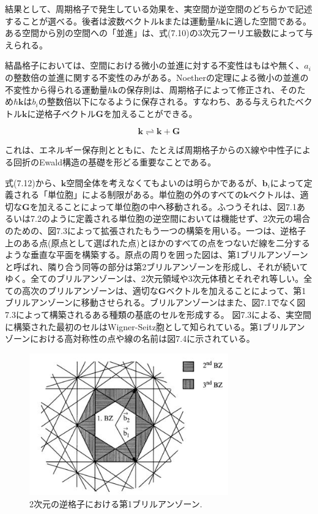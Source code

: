 \documentclass[11pt,a4j,uplatex]{jsarticle}
\begin{document}
結果として、周期格子で発生している効果を、実空間か逆空間のどちらかで記述することが選べる。後者は波数ベクトル$\bm{k}$または運動量$\hbar\bm{k}$に適した空間である。ある空間から別の空間への「並進」は、式(7.10)の3次元フーリエ級数によって与えられる。

結晶格子においては、空間における微小の並進に対する不変性はもはや無く、$a_i$の整数倍の並進に関する不変性のみがある。Noetherの定理による微小の並進の不変性から得られる運動量$\hbar\bm{k}$の保存則は、周期格子によって修正され、そのため$\hbar\bm{k}$は$b_i$の整数倍以下になるように保存される。すなわち、ある与えられたベクトル$\bm{k}$に逆格子ベクトル$\bm{G}$を加えることができる。

\begin{equation}
  \bm{k}\rightleftharpoons\bm{k}+\bm{G}\tag{7.12}
\end{equation}

これは、エネルギー保存則とともに、たとえば周期格子からのX線や中性子による回折のEwald構造の基礎を形どる重要なことである。

式(7.12)から、$\bm{k}$空間全体を考えなくてもよいのは明らかであるが、$\bm{b}_i$によって定義される「単位胞」による制限がある。単位胞の外のすべての$\bm{k}$ベクトルは、適切な$\bm{G}$を加えることによって単位胞の中へ移動される。ふつうそれは、図7.1あるいは7.2のように定義される単位胞の逆空間においては機能せず、2次元の場合のための、図7.3によって拡張されたもう一つの構築を用いる。一つは、逆格子上のある点(原点として選ばれた点)とほかのすべての点をつないだ線を二分するような垂直な平面を構築する。原点の周りを囲った図は、第1ブリルアンゾーンと呼ばれ、隣り合う同等の部分は第2ブリルアンゾーンを形成し、それが続いてゆく。全てのブリルアンゾーンは、2次元領域や3次元体積とそれぞれ等しい。全ての高次のブリルアンゾーンは、適切な$\bm{G}$ベクトルを加えることによって、第1ブリルアンゾーンに移動させられる。ブリルアンゾーンはまた、図7.1でなく図7.3によって構築されるある種類の基底のセルを形成する。
図7.3による、実空間に構築された最初のセルはWigner-Seitz胞として知られている。第1ブリルアンゾーンにおける高対称性の点や線の名前は図7.4に示されている。

\begin{figure}[tb]
 \centering
 \includegraphics[clip,width=8.6cm]{7_3.JPG}
 \caption{2次元の逆格子における第1ブリルアンゾーン.}
 \label{7.3}
\end{figure}
\end{document}
